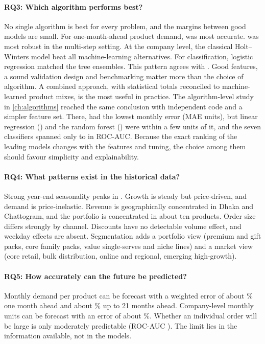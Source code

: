 \paragraph{RQ3: Which algorithm performs best?}
No single algorithm is best for every problem, and the margins between good models are small. For one-month-ahead
product demand, \BestReg was most accurate. \BestRec was most robust in the multi-step setting. At the company
level, the classical Holt--Winters model beat all machine-learning alternatives. For classification, logistic
regression matched the tree ensembles. This pattern agrees with \citet{makridakis2018}. Good features, a sound
validation design and benchmarking matter more than the choice of algorithm. A combined approach, with
statistical totals reconciled to machine-learned product mixes, is the most useful in practice. The
algorithm-level study in \cref{ch:algorithms} reached the same conclusion with independent code and a simpler
feature set. There, \AlgRegBest had the lowest monthly error (MAE \AlgRegBestMAE units), but linear regression
(\AlgLinMAE) and the random forest (\AlgRFMAE) were within a few units of it, and the seven classifiers spanned
only \AlgClsWorstAUC to \AlgClsBestAUC in ROC-AUC. Because the exact ranking of the leading models changes with
the features and tuning, the choice among them should favour simplicity and explainability.

\paragraph{RQ4: What patterns exist in the historical data?}
Strong year-end seasonality peaks in \PeakMonth. Growth is steady but price-driven, and demand is
price-inelastic. Revenue is geographically concentrated in Dhaka and Chattogram, and the portfolio is
concentrated in about ten products. Order size differs strongly by channel. Discounts have no detectable volume
effect, and weekday effects are absent. Segmentation adds a portfolio view (premium and gift packs, core family
packs, value single-serves and niche lines) and a market view (core retail, bulk distribution, online and
regional, emerging high-growth).

\paragraph{RQ5: How accurately can the future be predicted?}
Monthly demand per product can be forecast with a weighted error of about \BestRegWAPE\% one month ahead and
about \BestRecWAPE\% up to 21 months ahead. Company-level monthly units can be forecast with an error of about
\HWMAPE\%. Whether an individual order will be large is only moderately predictable (ROC-AUC \ClsAUC). The
limit lies in the information available, not in the models.

